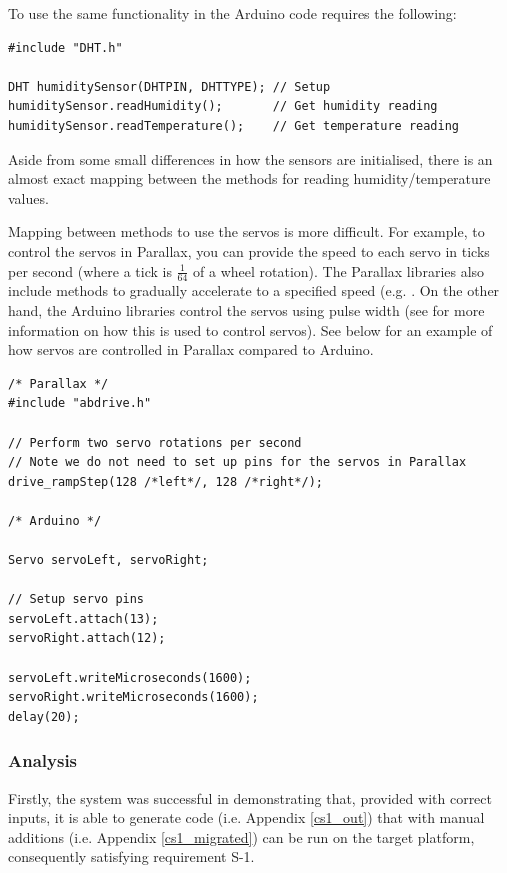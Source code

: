 \documentclass{UoYCSproject}
\begin{document}
To use the same functionality in the Arduino code requires the following:
\begin{verbatim}
#include "DHT.h"

DHT humiditySensor(DHTPIN, DHTTYPE); // Setup
humiditySensor.readHumidity();       // Get humidity reading
humiditySensor.readTemperature();    // Get temperature reading
\end{verbatim}

Aside from some small differences in how the sensors are initialised, there is an almost exact mapping between the methods for reading humidity/temperature values. 

Mapping between methods to use the servos is more difficult. For example, to control the servos in Parallax, you can provide the speed to each servo in ticks per second (where a tick is $\frac{1}{64}$ of a wheel rotation). The Parallax libraries also include methods to gradually accelerate to a specified speed (e.g. . On the other hand, the Arduino libraries control the servos using pulse width (see \parencite{pulse_width} for more information on how this is used to control servos). See below for an example of how servos are controlled in Parallax compared to Arduino.
\begin{verbatim}
/* Parallax */
#include "abdrive.h"

// Perform two servo rotations per second
// Note we do not need to set up pins for the servos in Parallax
drive_rampStep(128 /*left*/, 128 /*right*/); 

/* Arduino */

Servo servoLeft, servoRight;

// Setup servo pins
servoLeft.attach(13);
servoRight.attach(12);

servoLeft.writeMicroseconds(1600);
servoRight.writeMicroseconds(1600);
delay(20); 
\end{verbatim}

\subsubsection{Analysis} \label{cs1_analysis}
Firstly, the system was successful in demonstrating that, provided with correct inputs, it is able to generate code (i.e. Appendix \ref{cs1_out}) that with manual additions (i.e. Appendix \ref{cs1_migrated}) can be run on the target platform, consequently satisfying requirement S-1.
 
\end{document}
